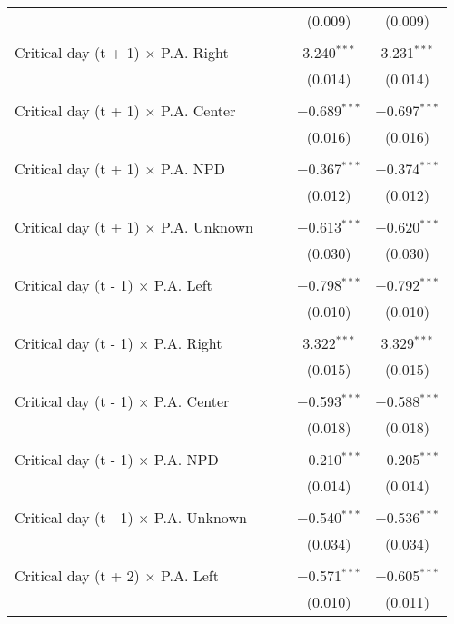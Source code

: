 \documentclass[
]{article}
\begin{document}
\begin{table}[!htbp]
{\begin{tabular}{@{\extracolsep{5pt}}lcccc}
  &  &  & (0.009) & (0.009) \\ 
  & & & & \\ 
 Critical day (t + 1) $\times$ P.A. Right &  &  & 3.240$^{***}$ & 3.231$^{***}$ \\ 
  &  &  & (0.014) & (0.014) \\ 
  & & & & \\ 
 Critical day (t + 1) $\times$ P.A. Center &  &  & $-$0.689$^{***}$ & $-$0.697$^{***}$ \\ 
  &  &  & (0.016) & (0.016) \\ 
  & & & & \\ 
 Critical day (t + 1) $\times$ P.A. NPD &  &  & $-$0.367$^{***}$ & $-$0.374$^{***}$ \\ 
  &  &  & (0.012) & (0.012) \\ 
  & & & & \\ 
 Critical day (t + 1) $\times$ P.A. Unknown &  &  & $-$0.613$^{***}$ & $-$0.620$^{***}$ \\ 
  &  &  & (0.030) & (0.030) \\ 
  & & & & \\ 
 Critical day (t - 1) $\times$ P.A. Left &  &  & $-$0.798$^{***}$ & $-$0.792$^{***}$ \\ 
  &  &  & (0.010) & (0.010) \\ 
  & & & & \\ 
 Critical day (t - 1) $\times$ P.A. Right &  &  & 3.322$^{***}$ & 3.329$^{***}$ \\ 
  &  &  & (0.015) & (0.015) \\ 
  & & & & \\ 
 Critical day (t - 1) $\times$ P.A. Center &  &  & $-$0.593$^{***}$ & $-$0.588$^{***}$ \\ 
  &  &  & (0.018) & (0.018) \\ 
  & & & & \\ 
 Critical day (t - 1) $\times$ P.A. NPD &  &  & $-$0.210$^{***}$ & $-$0.205$^{***}$ \\ 
  &  &  & (0.014) & (0.014) \\ 
  & & & & \\ 
 Critical day (t - 1) $\times$ P.A. Unknown &  &  & $-$0.540$^{***}$ & $-$0.536$^{***}$ \\ 
  &  &  & (0.034) & (0.034) \\ 
  & & & & \\ 
 Critical day (t + 2) $\times$ P.A. Left &  &  & $-$0.571$^{***}$ & $-$0.605$^{***}$ \\ 
  &  &  & (0.010) & (0.011) \\ 

\end{tabular}}
\end{table}
\end{document}

